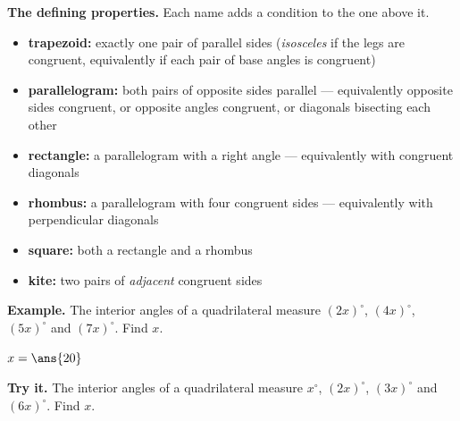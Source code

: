 \documentclass[12pt]{article}
\begin{document}

\begin{formulabox}
\textbf{The defining properties.} Each name adds a condition to the one above it.
\begin{itemize}[leftmargin=0.6cm, itemsep=0pt, topsep=1pt]
  \item \textbf{trapezoid:} exactly one pair of parallel sides
        (\emph{isosceles} if the legs are congruent, equivalently if each pair of
        base angles is congruent)
  \item \textbf{parallelogram:} both pairs of opposite sides parallel ---
        equivalently opposite sides congruent, or opposite angles congruent, or
        diagonals bisecting each other
  \item \textbf{rectangle:} a parallelogram with a right angle --- equivalently
        with congruent diagonals
  \item \textbf{rhombus:} a parallelogram with four congruent sides ---
        equivalently with perpendicular diagonals
  \item \textbf{square:} both a rectangle and a rhombus
  \item \textbf{kite:} two pairs of \emph{adjacent} congruent sides
\end{itemize}
\end{formulabox}


\begin{examplebox}
\textbf{Example.} The interior angles of a quadrilateral measure $(2x)^\circ$,
$(4x)^\circ$, $(5x)^\circ$ and $(7x)^\circ$. Find $x$.

$x = \ans{20}$
\end{examplebox}

\begin{tryitbox}
\textbf{Try it.} The interior angles of a quadrilateral measure $x^\circ$,
$(2x)^\circ$, $(3x)^\circ$ and $(6x)^\circ$. Find $x$.\\[2pt]
\end{tryitbox}

\end{document}
